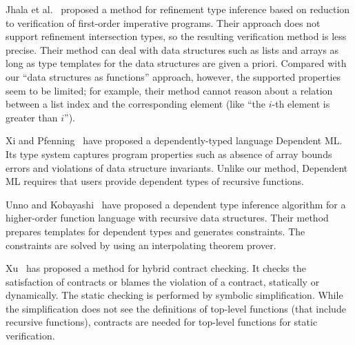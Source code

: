 
Jhala et al.~\cite{Jhala2011} proposed a method for refinement type inference
based on reduction to verification of first-order imperative programs.
Their approach does not support refinement intersection types, so
the resulting verification method is less precise.
Their method can deal with data structures such as lists and arrays
as long as type templates for the data structures are given a priori.
Compared with our ``data structures as functions'' approach, however,
the supported properties seem to be limited; for example, their method
cannot reason about a relation between a list index and the corresponding
element (like ``the \(i\)-th element is greater than \(i\)'').

Xi and Pfenning~\cite{Xi1999} have proposed a dependently-typed language
Dependent ML.  Its type system captures program properties such as
absence of array bounds errors and violations of data structure
invariants.  Unlike our method, Dependent ML requires that users provide
dependent types of recursive functions.

Unno and Kobayashi~\cite{Unno2009} have proposed a dependent type
inference algorithm for a higher-order function language with recursive
data structures.  Their method prepares templates for dependent types
and generates constraints.  The constraints are solved by using an
interpolating theorem prover.

Xu~\cite{Xu2012} has proposed a method for hybrid contract checking.  It checks the
satisfaction of contracts or blames the violation of a contract,
statically or dynamically.  The static checking is performed by symbolic
simplification.  While the simplification does not see the definitions
of top-level functions (that include recursive functions), contracts are
needed for top-level functions for static verification.


